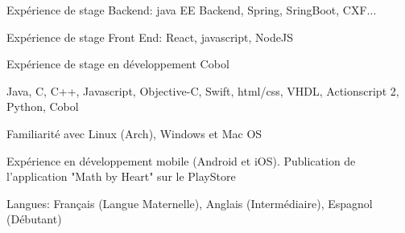 \begin{cvitems}
\item{Expérience de stage Backend: java EE Backend, Spring, SringBoot, CXF...}
\item{Expérience de stage Front End: React, javascript, NodeJS}
\item{Expérience de stage en développement Cobol}
\item{Java, C, C++, Javascript, Objective-C, Swift, html/css, VHDL, Actionscript 2, Python, Cobol}
\item{Familiarité avec Linux (Arch), Windows et Mac OS}
\item{Expérience en développement mobile (Android et iOS). Publication de l'application "Math by Heart" sur le PlayStore}
\item{Langues: Français (Langue Maternelle), Anglais (Intermédiaire), Espagnol (Débutant)}
\end{cvitems}

